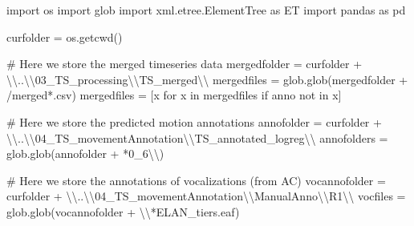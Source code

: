 \documentclass[
  letterpaper,
  DIV=11,
  numbers=noendperiod]{scrreprt}
\newenvironment{Shaded}{\begin{snugshade}}{\end{snugshade}}
\newcommand{\CharTok}[1]{\textcolor[rgb]{0.13,0.47,0.30}{#1}}
\newcommand{\CommentTok}[1]{\textcolor[rgb]{0.37,0.37,0.37}{#1}}
\newcommand{\ControlFlowTok}[1]{\textcolor[rgb]{0.00,0.23,0.31}{#1}}
\newcommand{\ImportTok}[1]{\textcolor[rgb]{0.00,0.46,0.62}{#1}}
\newcommand{\KeywordTok}[1]{\textcolor[rgb]{0.00,0.23,0.31}{#1}}
\newcommand{\NormalTok}[1]{\textcolor[rgb]{0.00,0.23,0.31}{#1}}
\newcommand{\OperatorTok}[1]{\textcolor[rgb]{0.37,0.37,0.37}{#1}}
\newcommand{\StringTok}[1]{\textcolor[rgb]{0.13,0.47,0.30}{#1}}
\begin{document}
\begin{Shaded}
\begin{Highlighting}[]
\ImportTok{import}\NormalTok{ os}
\ImportTok{import}\NormalTok{ glob}
\ImportTok{import}\NormalTok{ xml.etree.ElementTree }\ImportTok{as}\NormalTok{ ET}
\ImportTok{import}\NormalTok{ pandas }\ImportTok{as}\NormalTok{ pd}

\NormalTok{curfolder }\OperatorTok{=}\NormalTok{ os.getcwd()}

\CommentTok{\# Here we store the merged timeseries data}
\NormalTok{mergedfolder }\OperatorTok{=}\NormalTok{ curfolder }\OperatorTok{+} \StringTok{\textquotesingle{}}\CharTok{\textbackslash{}\textbackslash{}}\StringTok{..}\CharTok{\textbackslash{}\textbackslash{}}\StringTok{03\_TS\_processing}\CharTok{\textbackslash{}\textbackslash{}}\StringTok{TS\_merged}\CharTok{\textbackslash{}\textbackslash{}}\StringTok{\textquotesingle{}}
\NormalTok{mergedfiles }\OperatorTok{=}\NormalTok{ glob.glob(mergedfolder }\OperatorTok{+} \StringTok{\textquotesingle{}/merged*.csv\textquotesingle{}}\NormalTok{)}
\NormalTok{mergedfiles }\OperatorTok{=}\NormalTok{ [x }\ControlFlowTok{for}\NormalTok{ x }\KeywordTok{in}\NormalTok{ mergedfiles }\ControlFlowTok{if} \StringTok{\textquotesingle{}anno\textquotesingle{}} \KeywordTok{not} \KeywordTok{in}\NormalTok{ x]}

\CommentTok{\# Here we store the predicted motion annotations}
\NormalTok{annofolder }\OperatorTok{=}\NormalTok{ curfolder }\OperatorTok{+} \StringTok{\textquotesingle{}}\CharTok{\textbackslash{}\textbackslash{}}\StringTok{..}\CharTok{\textbackslash{}\textbackslash{}}\StringTok{04\_TS\_movementAnnotation}\CharTok{\textbackslash{}\textbackslash{}}\StringTok{TS\_annotated\_logreg}\CharTok{\textbackslash{}\textbackslash{}}\StringTok{\textquotesingle{}}
\NormalTok{annofolders }\OperatorTok{=}\NormalTok{ glob.glob(annofolder }\OperatorTok{+} \StringTok{\textquotesingle{}*0\_6}\CharTok{\textbackslash{}\textbackslash{}}\StringTok{\textquotesingle{}}\NormalTok{)}

\CommentTok{\# Here we store the annotations of vocalizations (from AC)}
\NormalTok{vocannofolder }\OperatorTok{=}\NormalTok{ curfolder }\OperatorTok{+} \StringTok{\textquotesingle{}}\CharTok{\textbackslash{}\textbackslash{}}\StringTok{..}\CharTok{\textbackslash{}\textbackslash{}}\StringTok{04\_TS\_movementAnnotation}\CharTok{\textbackslash{}\textbackslash{}}\StringTok{ManualAnno}\CharTok{\textbackslash{}\textbackslash{}}\StringTok{R1}\CharTok{\textbackslash{}\textbackslash{}}\StringTok{\textquotesingle{}}
\NormalTok{vocfiles }\OperatorTok{=}\NormalTok{ glob.glob(vocannofolder }\OperatorTok{+} \StringTok{\textquotesingle{}}\CharTok{\textbackslash{}\textbackslash{}}\StringTok{*ELAN\_tiers.eaf\textquotesingle{}}\NormalTok{)}


\end{Highlighting}
\end{Shaded}
\end{document}
